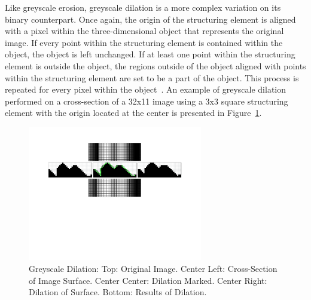 \documentclass{sig-alternate}
\begin{document}
Like greyscale erosion, greyscale dilation is a more complex variation on its binary counterpart. Once again, the origin of the structuring element is aligned with a pixel within the three-dimensional object that represents the original image. If every point within the structuring element is contained within the object, the object is left unchanged. If at least one point within the structuring element is outside the object, the regions outside of the object aligned with points within the structuring element are set to be a part of the object. This process is repeated for every pixel within the object~\cite{MorphologyPaper:1987, MorphologyWiki}. An example of greyscale dilation performed on a cross-section of a 32x11 image using a 3x3 square structuring element with the origin located at the center is presented in Figure~\ref{greyscale dilation figure}.
\begin{figure}
\centering
\includegraphics[width=3in,trim={0 4in 0 0},clip]{greyscale_dilation}
\caption{Greyscale Dilation: Top: Original Image. Center Left: Cross-Section of Image Surface. Center Center: Dilation Marked. Center Right: Dilation of Surface. Bottom: Results of Dilation.}
\label{greyscale dilation figure}
\end{figure}
\end{document}
